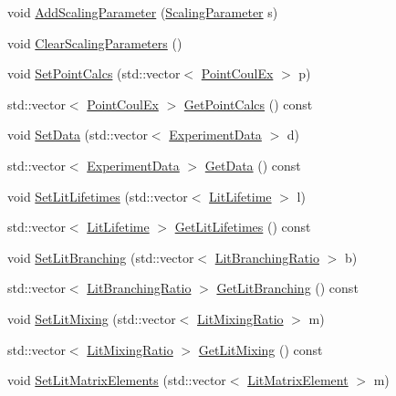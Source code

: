 \begin{DoxyCompactItemize}
\item 
void \hyperlink{classCoulExMinFCN_ab59a02517c6b599e4b7b3a944db52546}{Add\-Scaling\-Parameter} (\hyperlink{classScalingParameter}{Scaling\-Parameter} s)
\item 
void \hyperlink{classCoulExMinFCN_a69b535bb8e83e42aa2929a5f51e7d4d1}{Clear\-Scaling\-Parameters} ()
\item 
void \hyperlink{classCoulExMinFCN_a9de9dd0407e4535512ee2c37ac136e1f}{Set\-Point\-Calcs} (std\-::vector$<$ \hyperlink{classPointCoulEx}{Point\-Coul\-Ex} $>$ p)
\item 
std\-::vector$<$ \hyperlink{classPointCoulEx}{Point\-Coul\-Ex} $>$ \hyperlink{classCoulExMinFCN_ad5d143f2aae2e1282e66e7d2e052c2c0}{Get\-Point\-Calcs} () const 
\item 
void \hyperlink{classCoulExMinFCN_a7feea9ef22dc9dc19b6c3d1d8920bf74}{Set\-Data} (std\-::vector$<$ \hyperlink{classExperimentData}{Experiment\-Data} $>$ d)
\item 
std\-::vector$<$ \hyperlink{classExperimentData}{Experiment\-Data} $>$ \hyperlink{classCoulExMinFCN_a71fd7a796f622314d56ba56ed0e40587}{Get\-Data} () const 
\item 
void \hyperlink{classCoulExMinFCN_a54134d9c2323ea1338f7511106b0704b}{Set\-Lit\-Lifetimes} (std\-::vector$<$ \hyperlink{classLitLifetime}{Lit\-Lifetime} $>$ l)
\item 
std\-::vector$<$ \hyperlink{classLitLifetime}{Lit\-Lifetime} $>$ \hyperlink{classCoulExMinFCN_ab613d7df7a2b4219166254dcd48e868a}{Get\-Lit\-Lifetimes} () const 
\item 
void \hyperlink{classCoulExMinFCN_a378c6051a28d0fc3515dec15d1261d5f}{Set\-Lit\-Branching} (std\-::vector$<$ \hyperlink{classLitBranchingRatio}{Lit\-Branching\-Ratio} $>$ b)
\item 
std\-::vector$<$ \hyperlink{classLitBranchingRatio}{Lit\-Branching\-Ratio} $>$ \hyperlink{classCoulExMinFCN_a8f418391c6d2e5801ed3032ff88fb728}{Get\-Lit\-Branching} () const 
\item 
void \hyperlink{classCoulExMinFCN_afcfcae08a68fa14022c340302d78ec5d}{Set\-Lit\-Mixing} (std\-::vector$<$ \hyperlink{classLitMixingRatio}{Lit\-Mixing\-Ratio} $>$ m)
\item 
std\-::vector$<$ \hyperlink{classLitMixingRatio}{Lit\-Mixing\-Ratio} $>$ \hyperlink{classCoulExMinFCN_a5603de360de9f503e9ed2a538652e3d7}{Get\-Lit\-Mixing} () const 
\item 
void \hyperlink{classCoulExMinFCN_a1746ad1d1192d6e6eb523dc78e6a4de2}{Set\-Lit\-Matrix\-Elements} (std\-::vector$<$ \hyperlink{classLitMatrixElement}{Lit\-Matrix\-Element} $>$ m)

\end{DoxyCompactItemize}
